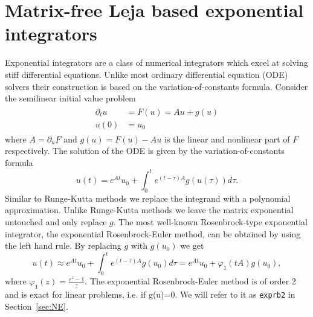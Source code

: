 \documentclass{scrartcl}
\begin{document}
	\section{Matrix-free Leja based exponential integrators} \label{sec:expint}
	Exponential integrators are a class of numerical integrators which excel at solving stiff differential equations. Unlike most ordinary differential equation (ODE) solvers their construction is based on the variation-of-constants formula. Consider the semilinear initial value problem
	\begin{align}
	\begin{split}
	\partial_tu &= F(u) = Au + g(u) \\ 
	u(0) &= u_0
	\end{split}\label{semilinear}
	\end{align}
	where $A = \partial_uF$ and $g(u) = F(u)-Au$ is the linear and nonlinear part of $F$ respectively. The solution of the ODE is given by the variation-of-constants formula
	\[
	u(t) = e^{At}u_0 + \int_{0}^{t}e^{(t-\tau)A}g(u(\tau))d\tau.
	\]
	Similar to Runge-Kutta methods we replace the integrand with a polynomial approximation. Unlike Runge-Kutta methods we leave the matrix exponential untouched and only replace $g$. The most well-known Rosenbrock-type exponential integrator, the exponential Rosenbrock-Euler method, can be obtained by using the left hand rule. By replacing $g$ with $g(u_0)$ we get
	\[
	u(t) \approx e^{At}u_0 + \int_{0}^{t}e^{(t-\tau)A}g(u_0)d\tau = e^{At}u_0 + \varphi_1(tA)g(u_0),
	\]
	where $\varphi_1(z) = \frac{e^z-1}z$. The exponential Rosenbrock-Euler method is of order 2 and is exact for linear problems, i.e. if g(u)=0. We will refer to it as \texttt{exprb2} in Section~\ref{sec:NE}.
\end{document}

